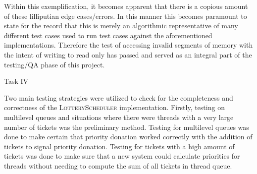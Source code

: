 \documentclass[12pt]{article}
\begin{document}
{Within this exemplification, it becomes apparent that there is a copious amount of these lilliputian edge cases/errors. In this manner this becomes paramount to state for the record that this is merely an algorithmic representative   
of many different test cases used to run test cases against the aforementioned implementations. Therefore the test of accessing invalid segments of memory with the intent of writing to read only has passed and served as an integral part of the testing/QA phase of this project. 
\begin{center}Task IV\end{center}
Two main testing strategies were utilized to check for the completeness and correctness of the \textsc{LotteryScheduler} implementation. 
  Firstly, testing on multilevel queues and situations where there were threads with a very large number 
  of tickets was the preliminary method. Testing for multilevel queues was done to make certain that priority 
  donation worked correctly with the addition of tickets to signal priority donation. Testing 
  for tickets with a high amount of tickets was done to make sure that a new system could calculate priorities 
  for threads without needing to compute the sum of all tickets in thread queue.\\\\
}
\end{document}
